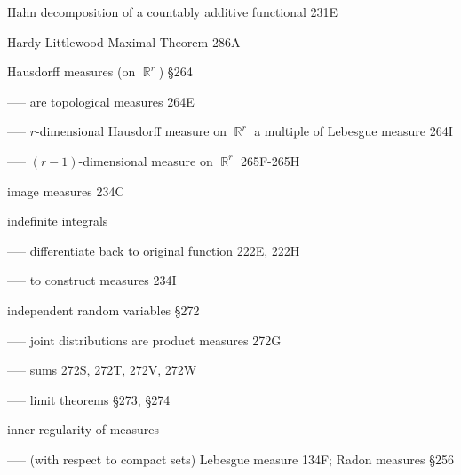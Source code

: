 Hahn decomposition of a countably additive functional 231E





Hardy-Littlewood Maximal Theorem 286A








Hausdorff measures (on $\BbbR^r$) \S264

----- are topological measures 264E

----- $r$-dimensional Hausdorff measure on $\BbbR^r$ a multiple of
Lebesgue measure 264I












----- $(r-1)$-dimensional measure on $\BbbR^r$ 265F-265H








\indexmedskip

image measures 234C





indefinite integrals

----- differentiate back to original function 222E, 222H


----- to construct measures 234I



independent random variables \S272

----- joint distributions are product measures 272G


----- sums 272S, 272T, 272V, 272W

----- limit theorems \S273, \S274










inner regularity of measures



----- (with respect to compact sets) Lebesgue measure 134F;
Radon measures \S256

















